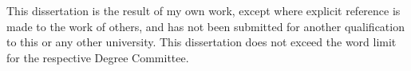 
\begin{abstract}[\large{\thetitle}\\ \vspace*{1.5cm} \normalsize{\textit{Abstract}}]
	This thesis presents some work that I did.
\end{abstract}

\begin{declaration}
  This dissertation is the result of my own work, except where explicit reference is made to the work of others, and has not been submitted for another qualification to this or any other university. This dissertation does not exceed the word limit for the respective Degree Committee.
  \vspace*{1cm}
  \begin{flushright}
	  \theauthor
  \end{flushright}
\end{declaration}

